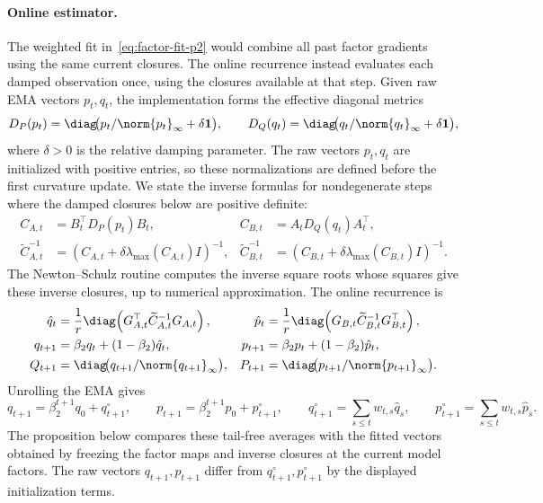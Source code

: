 \paragraph{Online estimator.}
The weighted fit in~\eqref{eq:factor-fit-p2} would combine all past
factor gradients using the same current closures. The online recurrence
instead evaluates each damped observation once, using the closures available
at that step. Given raw EMA vectors $p_t,q_t$, the implementation forms
the effective diagonal metrics
\[
  D_P(p_t)=\diag\!\bigl(p_t/\norm{p_t}_\infty+\delta\mathbf 1\bigr),
  \qquad
  D_Q(q_t)=\diag\!\bigl(q_t/\norm{q_t}_\infty+\delta\mathbf 1\bigr),
\]
where $\delta>0$ is the relative damping parameter. The raw vectors
$p_t,q_t$ are initialized with positive entries, so these normalizations are
defined before the first curvature update. We state the inverse formulas for
nondegenerate steps where the damped closures below are positive definite:
\[
\begin{aligned}
  C_{A,t}&=B_t^\top D_P(p_t)B_t,
  &
  C_{B,t}&=A_tD_Q(q_t)A_t^\top,\\
  \widetilde C_{A,t}^{-1}
  &=(C_{A,t}+\delta\lambda_{\max}(C_{A,t})I)^{-1},
  &
  \widetilde C_{B,t}^{-1}
  &=(C_{B,t}+\delta\lambda_{\max}(C_{B,t})I)^{-1}.
\end{aligned}
\]
The Newton--Schulz routine computes the inverse square roots whose squares
give these inverse closures, up to numerical approximation. The online
recurrence is
\begin{equation}\label{eq:ours-klcoupling-p2}
\begin{aligned}
  \hat{q}_t
    &= \frac1r\diag\!\left(G_{A,t}^\top \widetilde C_{A,t}^{-1}G_{A,t}\right),
  &
  \hat{p}_t
    &= \frac1r\diag\!\left(G_{B,t}\widetilde C_{B,t}^{-1}G_{B,t}^\top\right),
  \\
  q_{t+1}
    &= \beta_2q_t+(1-\beta_2)\hat{q}_t,
  &
  p_{t+1}
    &= \beta_2p_t+(1-\beta_2)\hat{p}_t,
  \\
  Q_{t+1}
    &= \diag\!\bigl(q_{t+1}/\norm{q_{t+1}}_\infty\bigr),
  &
  P_{t+1}
    &= \diag\!\bigl(p_{t+1}/\norm{p_{t+1}}_\infty\bigr).
\end{aligned}
\end{equation}
Unrolling the EMA gives
\[
  q_{t+1}
  =
  \beta_2^{t+1}q_0+q^\circ_{t+1},
  \qquad
  p_{t+1}
  =
  \beta_2^{t+1}p_0+p^\circ_{t+1},
  \qquad
  q^\circ_{t+1}=\sum_{s\le t}w_{t,s}\hat q_s,
  \qquad
  p^\circ_{t+1}=\sum_{s\le t}w_{t,s}\hat p_s .
\]
The proposition below compares these tail-free averages with the fitted
vectors obtained by freezing the factor maps and inverse closures at the
current model factors. The raw vectors $q_{t+1},p_{t+1}$ differ from
$q^\circ_{t+1},p^\circ_{t+1}$ by the displayed initialization terms.

